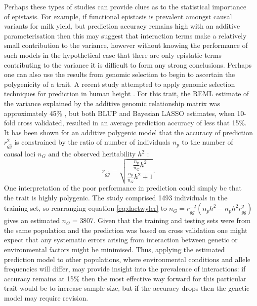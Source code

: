 Perhaps these types of studies can provide clues as to the statistical importance of epistasis. For example, if functional epistasis is prevalent amongst causal variants for milk yield, but prediction accuracy remains high with an additive parameterisation then this may suggest that interaction terms make a relatively small contribution to the variance, however without knowing the performance of such models in the hypothetical case that there are only epistatic terms contributing to the variance it is difficult to form any strong conclusions. Perhaps one can also use the results from genomic selection to begin to ascertain the polygenicity of a trait. A recent study attempted to apply genomic selection techniques for prediction in human height \citep{Makowsky2011}. For this trait, the REML estimate of the variance explained by the additive genomic relationship matrix was approximately 45\% \citep{Yang2010}, but both BLUP and Bayesian LASSO estimates, when 10-fold cross validated, resulted in an average prediction accuracy of less that 15\%. It has been shown for an additive polygenic model that the accuracy of prediction $r_{g\hat{g}}^{2}$ is constrained by the ratio of number of individuals $n_{p}$ to the number of causal loci $n_{G}$ and the observed heritability $h^{2}$ \citep{Daetwyler2008}:
\begin{equation}
r_{g\hat{g}} = \sqrt{\frac{\frac{n_{p}}{n_{G}}h^{2}}{\frac{n_{p}}{n_{G}}h^{2}  + 1}}.
\label{eq:daetwyler}
\end{equation}
One interpretation of the poor performance in prediction could simply be that the trait is highly polygenic. The study comprised 1493 individuals in the training set, so rearranging equation \ref{eq:daetwyler} to $n_{G} = r_{g\bar{g}}^{-2}(n_{p}h^{2} - n_{p}h^{2}r_{g\bar{g}}^{2})$ gives an estimated $n_{G} = 3807$. Given that the training and testing sets were from the same population and the prediction was based on cross validation one might expect that any systematic errors arising from interaction between genetic or environmental factors might be minimised. Thus, applying the estimated prediction model to other populations, where environmental conditions and allele frequencies will differ, may provide insight into the prevalence of interactions: if accuracy remains at 15\% then the most effective way forward for this particular trait would be to increase sample size, but if the accuracy drops then the genetic model may require revision.

